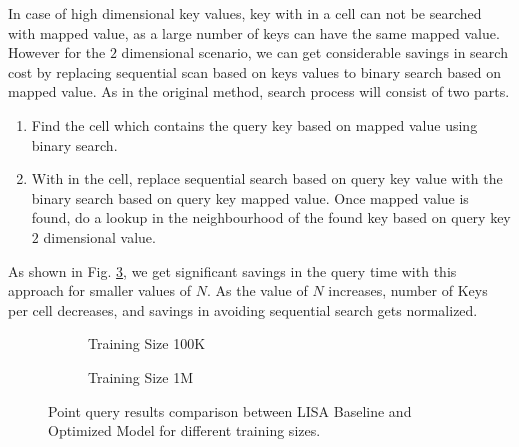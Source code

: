In case of high dimensional key values, key with in a cell can not be searched with mapped value, as a large number of keys can have the same mapped value. However for the $2$ dimensional scenario, we can get considerable savings in search cost by replacing sequential scan based on keys values to binary search based on mapped value. As in the original method, search process  will consist of two parts.
\begin{enumerate}
	\item Find the cell which contains the query key based on mapped value using binary search. 
	\item With in the cell, replace sequential search based on query key value with the  binary search based on query key mapped value. Once mapped value is found, do a lookup in the neighbourhood of the found key based on query key $2$ dimensional value. 
\end{enumerate}
As shown in Fig. \ref{fig:LISA_Baseline_Optimization}, we get significant savings in the query time with this approach for smaller values of $N$. As the value of $N$ increases, number of Keys per cell decreases, and savings in avoiding sequential search gets normalized. 


\begin{figure}
 \centering
     \begin{subfigure}[b]{0.45\textwidth}
         \centering
         
         \caption{Training Size 100K}
         \label{fig:2d_exp4_3_1}
     \end{subfigure}
     \begin{subfigure}[b]{0.45\textwidth}
         \centering
         
         \caption{Training Size 1M}
         \label{fig:2d_exp4_3_2}
     \end{subfigure}
     \caption{Point query results comparison between LISA Baseline and Optimized Model for different training sizes.}
     \label{fig:LISA_Baseline_Optimization}
\end{figure}

